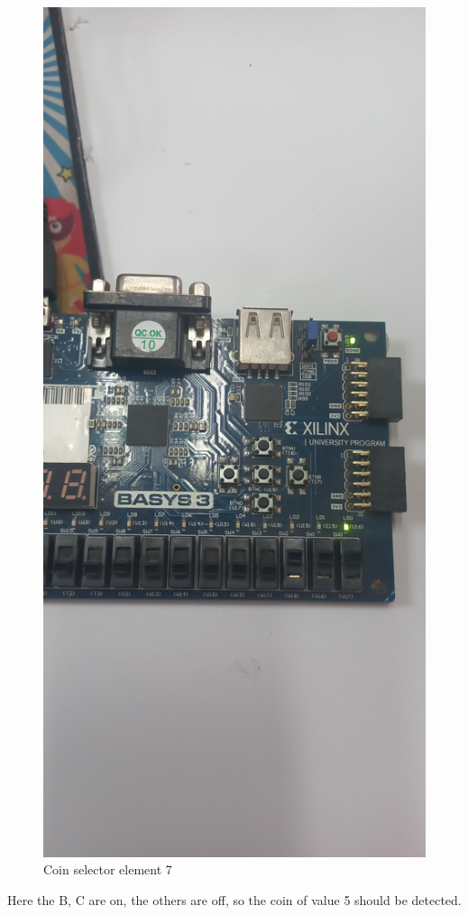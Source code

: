 \documentclass{article}
\begin{document}
\begin{multicols}{2}
	\begin{figure}[H]
		\centering
		\includegraphics[width=0.8\linewidth]{images/diagrams/coin-selector/coin-selector7.jpg}
		\caption{Coin selector element 7}
		\label{Coin selector element 7}
	\end{figure}

	Here the B, C are on, the others are off, so the coin of value 5 should be detected.


\end{multicols}
\end{document}
